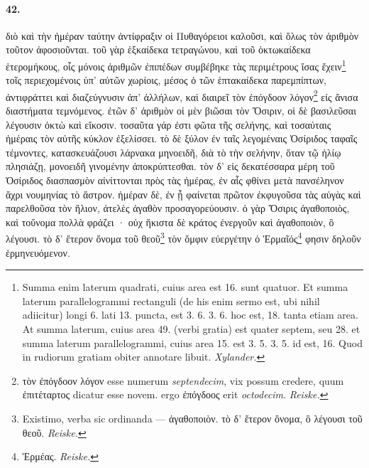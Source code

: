 \documentclass[a4paper, 11pt, oneside, polutonikogreek, german]{article}
\begin{document}
\paragraph{42.}
διὸ καὶ τὴν ἡμέραν ταύτην ἀντίφραξιν οἱ Πυθαγόρειοι καλοῦσι, καὶ ὅλως τὸν ἀριθμὸν τοῦτον ἀφοσιοῦνται. τοῦ γὰρ ἑξκαίδεκα τετραγώνου, καὶ τοῦ ὀκτωκαίδεκα ἑτερομήκους, οἷς μόνοις ἀριθμῶν ἐπιπέδων συμβέβηκε τὰς περιμέτρους ἴσας ἔχειν\footnote{Summa enim laterum quadrati, cuius area est 16. sunt quatuor. Et summa laterum parallelogrammi rectanguli (de his enim sermo est, ubi nihil adiicitur) longi 6. lati 13. puncta, est 3. 6. 3. 6. hoc est, 18. tanta etiam area. At summa laterum, cuius area 49. (verbi gratia) est quater septem, seu 28. et summa laterum parallelogrammi, cuius area 15. est 3. 5. 3. 5. id est, 16. Quod in rudiorum gratiam obiter annotare libuit. \emph{Xylander.}} τοῖς περιεχομένοις ὑπ' αὐτῶν χωρίοις, μέσος ὁ τῶν ἑπτακαίδεκα παρεμπίπτων, ἀντιφράττει καὶ διαζεύγνυσιν ἀπ' ἀλλήλων, καὶ διαιρεῖ τὸν ἐπόγδοον λόγον\footnote{τὸν ἐπόγδοον λόγον esse numerum \emph{septendecim}, vix possum credere, quum ἐπιτέταρτος dicatur esse novem. ergo ἐπόγδοος erit \emph{octodecim}. \emph{Reiske.} } εἰς ἄνισα διαστήματα τεμνόμενος. ἐτῶν δ' ἀριθμὸν οἱ μὲν βιῶσαι τὸν Ὄσιριν, οἱ δὲ βασιλεῦσαι λέγουσιν ὀκτὼ καὶ εἴκοσιν. τοσαῦτα γάρ ἐστι φῶτα τῆς σελήνης, καὶ τοσαύταις ἡμέραις τὸν αὐτῆς κύκλον ἐξελίσσει. τὸ δὲ ξύλον ἐν ταῖς λεγομέναις Ὀσίριδος ταφαῖς τέμνοντες, κατασκευάζουσι λάρνακα μηνοειδῆ, διὰ τὸ τὴν σελήνην, ὅταν τῷ ἡλίῳ πλησιάζῃ, μονοειδῆ γινομένην ἀποκρύπτεσθαι. τὸν δ' εἰς δεκατέσσαρα μέρη τοῦ Ὀσίριδος διασπασμὸν αἰνίττονται πρὸς τὰς ἡμέρας, ἐν αἷς φθίνει μετὰ πανσέληνον ἄχρι νουμηνίας τὸ ἄστρον. ἡμέραν δὲ, ἐν ᾗ φαίνεται πρῶτον ἐκφυγοῦσα τὰς αὐγὰς καὶ παρελθοῦσα τὸν ἥλιον, ἀτελὲς ἀγαθὸν προσαγορεύουσιν. ὁ γὰρ Ὄσιρις ἀγαθοποιὸς, καὶ τοὔνομα πολλὰ φράζει · οὐχ ἥκιστα δὲ κράτος ἐνεργοῦν καὶ ἀγαθοποιὸν, ὃ λέγουσι. τὸ δ' ἕτερον ὄνομα τοῦ θεοῦ\footnote{Existimo, verba sic ordinanda --- ἀγαθοποιὸν. τὸ δ' ἕτερον ὂνομα, ὃ λέγουσι τοῦ θεοῦ. \emph{Reiske.}} τὸν ὄμφιν εὐεργέτην ὁ Ἑρμαῖός\footnote{Ἑρμέας. \emph{Reiske.}} φησιν δηλοῦν ἑρμηνευόμενον.
\end{document}

